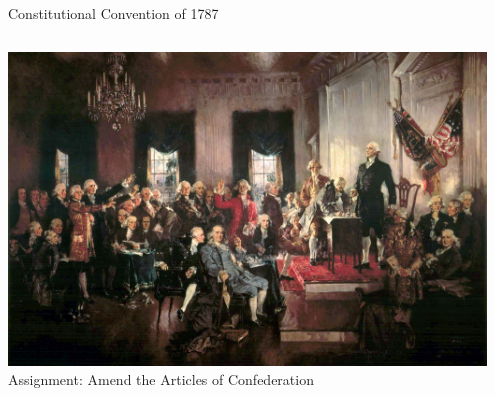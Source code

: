 \begin{frame}{Constitutional Convention of 1787}
    \begin{columns}[onlytextwidth]
            \centering
            \includegraphics[width=0.95\textwidth]{img/constitutional-convention.jpg} \\

            Assignment: Amend the Articles of Confederation
    \end{columns}
\end{frame}

